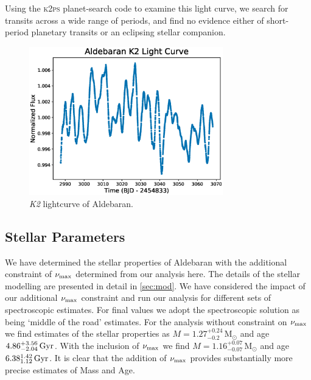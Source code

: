 \documentclass[modern]{aastex61}
\newcommand{\numax}{\mbox{$\nu_{\rm max}$}\xspace}
\newcommand{\ktwo}{\emph{K2}\xspace}
\begin{document}
Using the \textsc{k2ps} planet-search code \citep{k2ps,Pope2016} to examine this light curve, we search for transits across a wide range of periods, and find no evidence either of short-period planetary transits or an eclipsing stellar companion.

\begin{figure}
\centering
\includegraphics[width=0.75\textwidth]{aldebaran_lc.eps}
\caption{\ktwo lightcurve of Aldebaran.}
\label{k2_lightcurve}
\end{figure}

\subsection{Stellar Parameters}

We have determined the stellar properties of Aldebaran with the additional constraint of \numax determined from our analysis here.  The details of the stellar modelling are presented in detail in \ref{sec:mod}.  We have considered the impact of our additional \numax constraint and run our analysis for different sets of spectroscopic estimates.  For final values we adopt the \citet{2012Sheffield} spectroscopic solution as being `middle of the road' estimates.  For the analysis without constraint on \numax we find estimates of the stellar properties as $M = 1.27^{+0.24}_{-0.2} \, \mathrm{M_{\odot}}$ and age $4.86^{+3.56}_{-2.04} \, \rm Gyr$.  With the inclusion of \numax we find $M = 1.16^{+0.07}_{-0.07} \, \mathrm{M_{\odot}}$ and age $6.38^{1.42}_{1.12} \, \rm Gyr$.  It is clear that the addition of \numax provides substantially more precise estimates of Mass and Age.  %
\end{document}
